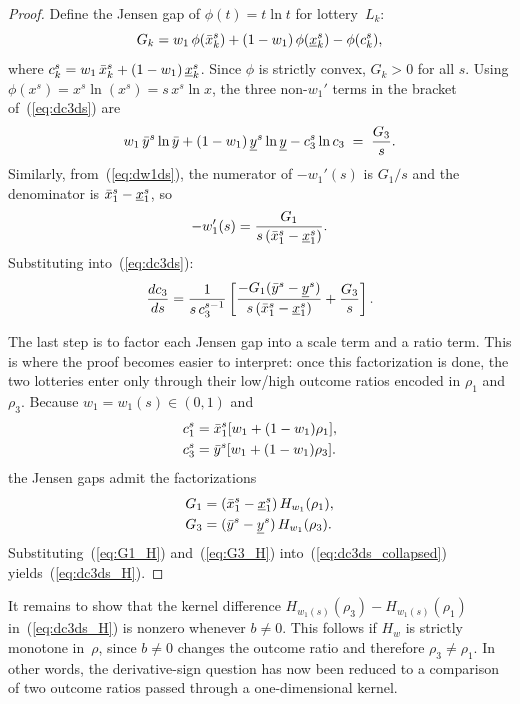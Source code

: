 \begin{proof}
Define the Jensen gap of $\phi(t) = t\ln t$ for lottery~$L_k$:
\begin{equation}\label{eq:jensen_gap_def}
  G_k
  = w_1\,\phi(\bar{x}_k^s) + (1-w_1)\,\phi(\underline{x}_k^s)
    - \phi(c_k^s),
\end{equation}
where $c_k^s = w_1\,\bar{x}_k^s + (1-w_1)\,\underline{x}_k^s$.
Since $\phi$ is strictly convex, $G_k > 0$ for all $s$.
Using $\phi(x^s) = x^s \ln(x^s) = s\, x^s \ln x$,
the three non-$w_1'$ terms in the bracket
of~(\ref{eq:dc3ds}) are
\begin{equation}\label{eq:bracket_J3}
  w_1\,\bar{y}^s \ln\bar{y}
  + (1-w_1)\,\underline{y}^s \ln\underline{y}
  - c_3^s \ln c_3
  \;=\; \frac{G_3}{s}.
\end{equation}
Similarly, from~(\ref{eq:dw1ds}), the numerator of
$-w_1'(s)$ is $G_1/s$ and the denominator is
$\bar{x}_1^s - \underline{x}_1^s$, so
\begin{equation}\label{eq:w1prime_J1}
  -w_1'(s) = \frac{G_1}
    {s\,(\bar{x}_1^s - \underline{x}_1^s)}.
\end{equation}
Substituting into~(\ref{eq:dc3ds}):
\begin{equation}\label{eq:dc3ds_collapsed}
  \frac{dc_3}{ds}
  = \frac{1}{s\, c_3^{s-1}}
    \left[
      \frac{-G_1(\bar{y}^s - \underline{y}^s)}
           {s\,(\bar{x}_1^s - \underline{x}_1^s)}
    + \frac{G_3}{s}\right].
\end{equation}

The last step is to factor each Jensen gap into a scale term and a ratio term.
This is where the proof becomes easier to interpret: once this factorization is
done, the two lotteries enter only through their low/high outcome ratios
encoded in $\rho_1$ and $\rho_3$.
Because $w_1 = w_1(s) \in (0,1)$ and
\[
  \begin{aligned}
    c_1^s &= \bar{x}_1^s [w_1 + (1-w_1)\rho_1], \\
    c_3^s &= \bar{y}^s [w_1 + (1-w_1)\rho_3].
  \end{aligned}
\]
the Jensen gaps admit the factorizations
\begin{align}
  G_1
  &= (\bar{x}_1^s - \underline{x}_1^s)\,H_{w_1}(\rho_1),
  \label{eq:G1_H} \\
  G_3
  &= (\bar{y}^s - \underline{y}^s)\,H_{w_1}(\rho_3).
  \label{eq:G3_H}
\end{align}
Substituting~(\ref{eq:G1_H}) and~(\ref{eq:G3_H}) into~(\ref{eq:dc3ds_collapsed})
yields~(\ref{eq:dc3ds_H}).
\end{proof}

It remains to show that the kernel difference
$H_{w_1(s)}(\rho_3) - H_{w_1(s)}(\rho_1)$ in~(\ref{eq:dc3ds_H}) is nonzero
whenever $b \neq 0$. This follows if $H_w$ is strictly monotone in~$\rho$,
since $b \neq 0$ changes the outcome ratio and therefore $\rho_3 \neq \rho_1$.
In other words, the derivative-sign question has now been reduced to a
comparison of two outcome ratios passed through a one-dimensional kernel.

